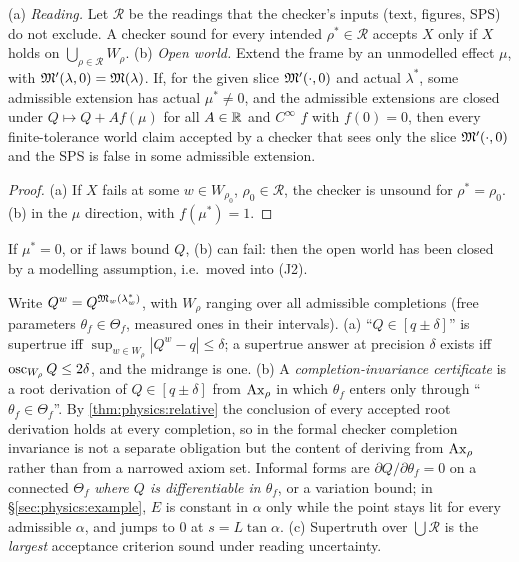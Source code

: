 \begin{theorem}\label{thm:physics:judgment}
(a) \emph{Reading.} Let $\mathcal R$ be the readings that the checker's inputs (text, figures,
SPS) do not exclude. A checker sound for every intended $\rho^*\in\mathcal R$ accepts $X$ only
if $X$ holds on $\bigcup_{\rho\in\mathcal R}W_\rho$. (b) \emph{Open world.} Extend the frame by
an unmodelled effect $\mu$, with $\mathfrak{M}'(\lambda,0)=\mathfrak{M}(\lambda)$. If, for the given slice
$\mathfrak{M}'(\cdot,0)$ and actual $\lambda^*$, some admissible extension has actual $\mu^*\neq0$,
and the admissible extensions are closed under $Q\mapsto Q+Af(\mu)$ for all $A\in\mathbb{R}$ and
$C^\infty$ $f$ with $f(0)=0$, then every finite-tolerance world claim accepted by a checker
that sees only the slice $\mathfrak{M}'(\cdot,0)$ and the SPS is false in some admissible extension.
\end{theorem}
\begin{proof}
(a) If $X$ fails at some $w\in W_{\rho_0}$, $\rho_0\in\mathcal R$, the checker is unsound for
$\rho^*=\rho_0$. (b)  in the $\mu$ direction, with $f(\mu^*)=1$.
\end{proof}
If $\mu^*=0$, or if laws bound $Q$, (b) can fail: then the open world has been closed by a
modelling assumption, i.e.\ moved into (J2).

\begin{theorem}\label{thm:physics:superval}
Write $Q^w=Q^{\mathfrak{M}_w(\lambda^*_w)}$, with $W_\rho$ ranging over all admissible completions (free
parameters $\theta_f\in\Theta_f$, measured ones in their intervals). (a) ``$Q\in[q\pm\delta]$'' is
supertrue iff $\sup_{w\in W_\rho}|Q^w-q|\le\delta$; a supertrue answer at precision $\delta$
exists iff $\operatorname{osc}_{W_\rho}Q\le2\delta$, and the midrange is one. (b) A
\emph{completion-invariance certificate} is a root derivation of $Q\in[q\pm\delta]$ from
$\mathrm{Ax}_\rho$ in which $\theta_f$ enters only through ``$\theta_f\in\Theta_f$''. By
\cref{thm:physics:relative} the conclusion of every accepted root derivation holds at every
completion, so in the formal checker completion invariance is not a separate obligation but
the content of deriving from $\mathrm{Ax}_\rho$ rather than from a narrowed axiom set. Informal forms
are $\partial Q/\partial\theta_f=0$ on a connected $\Theta_f$ \emph{where $Q$ is
differentiable in $\theta_f$}, or a variation bound; in \S\ref{sec:physics:example}, $E$ is
constant in $\alpha$ only while the point stays lit for every admissible $\alpha$, and jumps
to $0$ at $s=L\tan\alpha$. (c) Supertruth over $\bigcup\mathcal R$ is the
\emph{largest} acceptance criterion sound under reading uncertainty.
\end{theorem}

